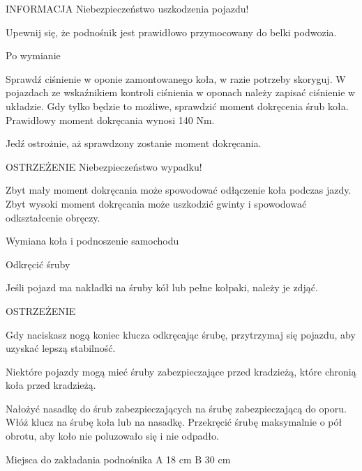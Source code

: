 INFORMACJA
Niebezpieczeństwo uszkodzenia pojazdu!
\begin{itemizeTriangle}
	\itemTriangle Upewnij się, że podnośnik jest prawidłowo przymocowany do belki podwozia.
\end{itemizeTriangle}

Po wymianie
\begin{itemizeArrow}
	\itemArrow Sprawdź ciśnienie w oponie zamontowanego koła, w razie potrzeby skoryguj.
	\itemArrow W pojazdach ze wskaźnikiem kontroli ciśnienia w oponach należy zapisać ciśnienie w układzie.
	\itemArrow Gdy tylko będzie to możliwe, sprawdzić moment dokręcenia śrub koła. Prawidłowy moment dokręcania wynosi 140 Nm.
\end{itemizeArrow}

Jedź ostrożnie, aż sprawdzony zostanie moment dokręcania.

OSTRZEŻENIE
Niebezpieczeństwo wypadku!
\begin{itemizeTriangle}
	\itemTriangle Zbyt mały moment dokręcania może spowodować odłączenie koła podczas jazdy.
	\itemTriangle Zbyt wysoki moment dokręcania może uszkodzić gwinty i spowodować odkształcenie obręczy.
\end{itemizeTriangle}

Wymiana koła i podnoszenie samochodu

Odkręcić śruby

\begin{itemizeArrow}
	\itemArrow Jeśli pojazd ma nakładki na śruby kół lub pełne kołpaki, należy je zdjąć.
\end{itemizeArrow}

OSTRZEŻENIE
\begin{itemizeTriangle}
	\itemTriangle Gdy naciskasz nogą koniec klucza odkręcając śrubę, przytrzymaj się pojazdu, aby uzyskać lepszą stabilność.
\end{itemizeTriangle}

Niektóre pojazdy mogą mieć śruby zabezpieczające przed kradzieżą, które chronią koła przed kradzieżą.
\begin{itemizeArrow}
	\itemArrow Nałożyć nasadkę do śrub zabezpieczających na śrubę zabezpieczającą do oporu.
	\itemArrow Włóż klucz na śrubę koła lub na nasadkę.
	\itemArrow Przekręcić śrubę maksymalnie o pół obrotu, aby koło nie poluzowało się i nie odpadło.
\end{itemizeArrow}


Miejsca do zakładania podnośnika
A 18 cm
B 30 cm

